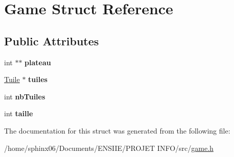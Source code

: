 \hypertarget{structGame}{}\section{Game Struct Reference}
\label{structGame}
\subsection*{Public Attributes}
\begin{DoxyCompactItemize}
\item 
\mbox{\label{structGame_a1decb21080af192386c0a7177a41f277}} 
int $\ast$$\ast$ {\bfseries plateau}
\item 
\mbox{\label{structGame_ac3fb01df4e1e340920e8b97b34d0db0b}} 
\hyperlink{structTuile}{Tuile} $\ast$ {\bfseries tuiles}
\item 
\mbox{\label{structGame_a119de7a9121b7142cd5db52803ae3977}} 
int {\bfseries nb\+Tuiles}
\item 
\mbox{\label{structGame_ada885d65654c46afafd089933d842b97}} 
int {\bfseries taille}
\end{DoxyCompactItemize}


The documentation for this struct was generated from the following file\+:\begin{DoxyCompactItemize}
\item 
/home/sphinx06/\+Documents/\+E\+N\+S\+I\+I\+E/\+P\+R\+O\+J\+E\+T I\+N\+F\+O/src/\hyperlink{game_8h}{game.\+h}\end{DoxyCompactItemize}
